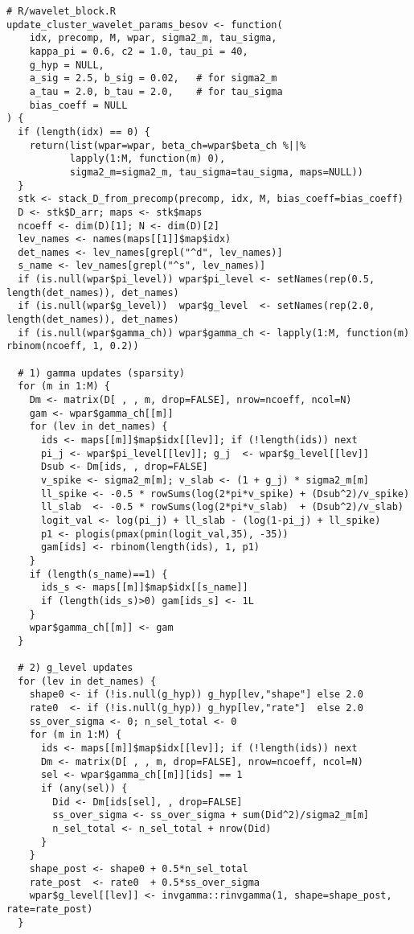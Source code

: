 \documentclass[11pt]{article}
\begin{document}
\begin{lstlisting}
# R/wavelet_block.R
update_cluster_wavelet_params_besov <- function(
    idx, precomp, M, wpar, sigma2_m, tau_sigma,
    kappa_pi = 0.6, c2 = 1.0, tau_pi = 40,
    g_hyp = NULL,
    a_sig = 2.5, b_sig = 0.02,   # for sigma2_m
    a_tau = 2.0, b_tau = 2.0,    # for tau_sigma
    bias_coeff = NULL
) {
  if (length(idx) == 0) {
    return(list(wpar=wpar, beta_ch=wpar$beta_ch %||%
           lapply(1:M, function(m) 0),
           sigma2_m=sigma2_m, tau_sigma=tau_sigma, maps=NULL))
  }
  stk <- stack_D_from_precomp(precomp, idx, M, bias_coeff=bias_coeff)
  D <- stk$D_arr; maps <- stk$maps
  ncoeff <- dim(D)[1]; N <- dim(D)[2]
  lev_names <- names(maps[[1]]$map$idx)
  det_names <- lev_names[grepl("^d", lev_names)]
  s_name <- lev_names[grepl("^s", lev_names)]
  if (is.null(wpar$pi_level)) wpar$pi_level <- setNames(rep(0.5, length(det_names)), det_names)
  if (is.null(wpar$g_level))  wpar$g_level  <- setNames(rep(2.0, length(det_names)), det_names)
  if (is.null(wpar$gamma_ch)) wpar$gamma_ch <- lapply(1:M, function(m) rbinom(ncoeff, 1, 0.2))

  # 1) gamma updates (sparsity)
  for (m in 1:M) {
    Dm <- matrix(D[ , , m, drop=FALSE], nrow=ncoeff, ncol=N)
    gam <- wpar$gamma_ch[[m]]
    for (lev in det_names) {
      ids <- maps[[m]]$map$idx[[lev]]; if (!length(ids)) next
      pi_j <- wpar$pi_level[[lev]]; g_j  <- wpar$g_level[[lev]]
      Dsub <- Dm[ids, , drop=FALSE]
      v_spike <- sigma2_m[m]; v_slab <- (1 + g_j) * sigma2_m[m]
      ll_spike <- -0.5 * rowSums(log(2*pi*v_spike) + (Dsub^2)/v_spike)
      ll_slab  <- -0.5 * rowSums(log(2*pi*v_slab)  + (Dsub^2)/v_slab)
      logit_val <- log(pi_j) + ll_slab - (log(1-pi_j) + ll_spike)
      p1 <- plogis(pmax(pmin(logit_val,35), -35))
      gam[ids] <- rbinom(length(ids), 1, p1)
    }
    if (length(s_name)==1) {
      ids_s <- maps[[m]]$map$idx[[s_name]]
      if (length(ids_s)>0) gam[ids_s] <- 1L
    }
    wpar$gamma_ch[[m]] <- gam
  }

  # 2) g_level updates
  for (lev in det_names) {
    shape0 <- if (!is.null(g_hyp)) g_hyp[lev,"shape"] else 2.0
    rate0  <- if (!is.null(g_hyp)) g_hyp[lev,"rate"]  else 2.0
    ss_over_sigma <- 0; n_sel_total <- 0
    for (m in 1:M) {
      ids <- maps[[m]]$map$idx[[lev]]; if (!length(ids)) next
      Dm <- matrix(D[ , , m, drop=FALSE], nrow=ncoeff, ncol=N)
      sel <- wpar$gamma_ch[[m]][ids] == 1
      if (any(sel)) {
        Did <- Dm[ids[sel], , drop=FALSE]
        ss_over_sigma <- ss_over_sigma + sum(Did^2)/sigma2_m[m]
        n_sel_total <- n_sel_total + nrow(Did)
      }
    }
    shape_post <- shape0 + 0.5*n_sel_total
    rate_post  <- rate0  + 0.5*ss_over_sigma
    wpar$g_level[[lev]] <- invgamma::rinvgamma(1, shape=shape_post, rate=rate_post)
  }


\end{lstlisting}
\end{document}
